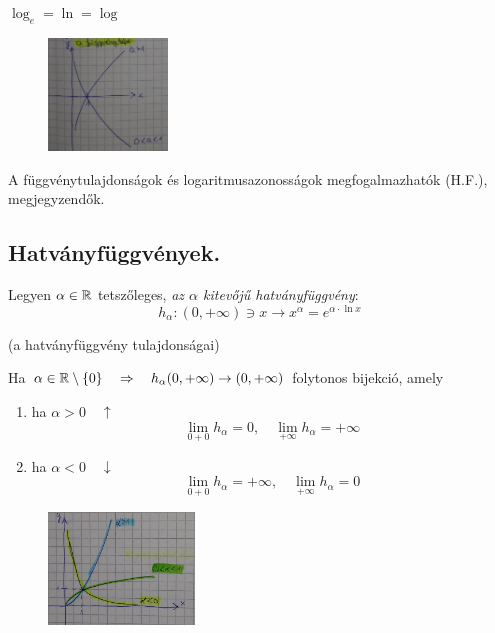 \documentclass[a4paper,11.5pt]{article}
\begin{document}
	\begin{note}
		$\log_e=\ln=\log$
		
		\begin{figure}[H]
			\centering
			\includegraphics[height=3cm]{kepek/03ea_10.jpg}
			\caption{}\label{}
		\end{figure}
	\end{note}
	\begin{note}
		A függvénytulajdonságok és logaritmusazonosságok megfogalmazhatók (H.F.), megjegyzendők.
	\end{note}
	\subsection{Hatványfüggvények.}
	\begin{definition}
		Legyen $\alpha\in\mathbb{R}$ tetszőleges, \textit{az $\alpha$ kitevőjű hatványfüggvény}:
		\[ h_\alpha:(0,+\infty)\ni x\to x^\alpha=e^{\alpha\cdot\ln x} \]
	\end{definition}
	\begin{theorem}
		(a hatványfüggvény tulajdonságai)
		
		Ha $\alpha\in\mathbb{R}\setminus\{0\} \quad \Rightarrow\quad h_\alpha(0,+\infty)\to(0,+\infty)$ folytonos bijekció, amely 
		\begin{enumerate}
			\item ha $\alpha>0 \quad \uparrow$
			\[ \lim_{0+0} h_\alpha=0,\quad \lim_{+\infty}h_\alpha=+\infty \]
			\item ha $\alpha<0\quad \downarrow$
			\[ \lim_{0+0}h_\alpha=+\infty,\quad \lim_{+\infty}h_\alpha=0 \]
		\end{enumerate}
		
		\begin{figure}[H]
			\centering
			\includegraphics[height=3cm]{kepek/03ea_11.jpg}
			\caption{}\label{}
		\end{figure}
	\end{theorem}
\end{document}
